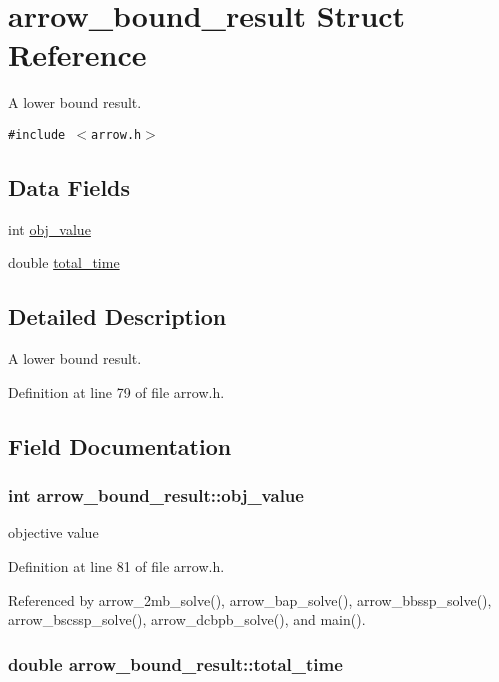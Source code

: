 \hypertarget{structarrow__bound__result}{
\section{arrow\_\-bound\_\-result Struct Reference}
\label{structarrow__bound__result}
}
A lower bound result.  


{\tt \#include $<$arrow.h$>$}

\subsection*{Data Fields}
\begin{CompactItemize}
\item 
int \hyperlink{structarrow__bound__result_acbca68de984376a60dbb9893935e0f4}{obj\_\-value}
\item 
double \hyperlink{structarrow__bound__result_d27a3cae43bbe1ed2e2c60a4ef307b08}{total\_\-time}
\end{CompactItemize}


\subsection{Detailed Description}
A lower bound result. 

Definition at line 79 of file arrow.h.

\subsection{Field Documentation}
\hypertarget{structarrow__bound__result_acbca68de984376a60dbb9893935e0f4}{
\subsubsection{\setlength{\rightskip}{0pt plus 5cm}int {\bf arrow\_\-bound\_\-result::obj\_\-value}}}
\label{structarrow__bound__result_acbca68de984376a60dbb9893935e0f4}


objective value 

Definition at line 81 of file arrow.h.

Referenced by arrow\_\-2mb\_\-solve(), arrow\_\-bap\_\-solve(), arrow\_\-bbssp\_\-solve(), arrow\_\-bscssp\_\-solve(), arrow\_\-dcbpb\_\-solve(), and main().\hypertarget{structarrow__bound__result_d27a3cae43bbe1ed2e2c60a4ef307b08}{
\subsubsection{\setlength{\rightskip}{0pt plus 5cm}double {\bf arrow\_\-bound\_\-result::total\_\-time}}}
\label{structarrow__bound__result_d27a3cae43bbe1ed2e2c60a4ef307b08}


